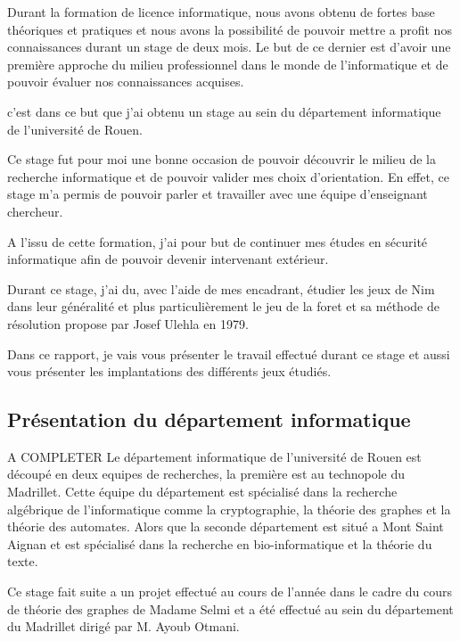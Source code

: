 Durant la formation de licence informatique, nous avons obtenu de fortes base théoriques et pratiques et nous avons la possibilité de pouvoir mettre a profit nos connaissances durant un stage de deux mois. Le but de ce dernier est d'avoir une première approche du milieu professionnel dans le monde de l'informatique et de pouvoir évaluer nos connaissances acquises.

c'est dans ce but que j'ai obtenu un stage au sein du département informatique de l’université de Rouen.

Ce stage fut pour moi une bonne occasion de pouvoir découvrir le milieu de la recherche informatique et de pouvoir valider mes choix d'orientation. En effet, ce stage m'a permis de pouvoir parler et travailler avec une équipe d'enseignant chercheur.

A l'issu de cette formation, j'ai pour but de continuer mes études en sécurité informatique afin de pouvoir devenir intervenant extérieur.

Durant ce stage, j'ai du, avec l'aide de mes encadrant, étudier les jeux de Nim dans leur généralité et plus particulièrement le jeu de la foret et sa méthode de résolution propose par Josef Ulehla en 1979.

Dans ce rapport, je vais vous présenter le travail effectué durant ce stage et aussi vous présenter les implantations des différents jeux étudiés.

\subsection{Présentation du département informatique}
\label{sub: Présentation du département informatique}
A COMPLETER
Le département informatique de l’université de Rouen est découpé en deux equipes de recherches, la première est au technopole du Madrillet. Cette équipe du département est spécialisé dans la recherche algébrique de l'informatique comme la cryptographie, la théorie des graphes et la théorie des automates. Alors que la seconde département est situé a Mont Saint Aignan et est spécialisé dans la recherche en bio-informatique et la théorie du texte.

Ce stage fait suite a un projet effectué au cours de l’année dans le cadre du cours de théorie des graphes de Madame Selmi et a été effectué au sein du département du Madrillet dirigé par M. Ayoub Otmani.
